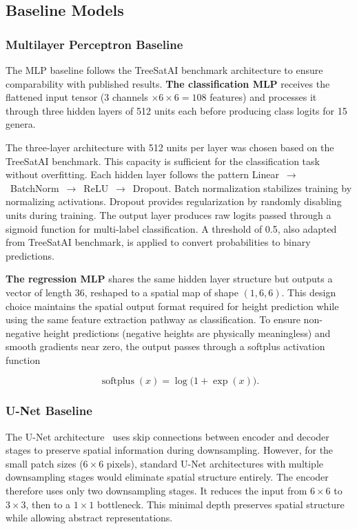 \subsection{Baseline Models}

\subsubsection{Multilayer Perceptron Baseline}

The MLP baseline follows the TreeSatAI benchmark architecture to ensure comparability with published results. \textbf{The classification MLP} receives the flattened input tensor (3 channels $\times 6 \times 6 = 108$ features) and processes it through three hidden layers of 512 units each before producing class logits for 15 genera.

The three-layer architecture with 512 units per layer was chosen based on the TreeSatAI benchmark. This capacity is sufficient for the classification task without overfitting. Each hidden layer follows the pattern Linear~$\rightarrow$~BatchNorm~$\rightarrow$~ReLU~$\rightarrow$~Dropout. Batch normalization stabilizes training by normalizing activations. Dropout provides regularization by randomly disabling units during training. The output layer produces raw logits passed through a sigmoid function for multi-label classification. A threshold of 0.5, also adapted from TreeSatAI benchmark, is applied to convert probabilities to binary predictions.

\textbf{The regression MLP} shares the same hidden layer structure but outputs a vector of length 36, reshaped to a spatial map of shape $(1, 6, 6)$. This design choice maintains the spatial output format required for height prediction while using the same feature extraction pathway as classification. To ensure non-negative height predictions (negative heights are physically meaningless) and smooth gradients near zero, the output passes through a softplus activation function

\begin{equation}
    \operatorname{softplus}(x) = \log\bigl(1 + \exp(x)\bigr).
\end{equation}

\subsubsection{U-Net Baseline}

The U-Net architecture~\cite{ronneberger_u-net_2015} uses skip connections between encoder and decoder stages to preserve spatial information during downsampling. However, for the small patch sizes ($6 \times 6$ pixels), standard U-Net architectures with multiple downsampling stages would eliminate spatial structure entirely. The encoder therefore uses only two downsampling stages. It reduces the input from $6 \times 6$ to $3 \times 3$, then to a $1 \times 1$ bottleneck. This minimal depth preserves spatial structure while allowing abstract representations.

